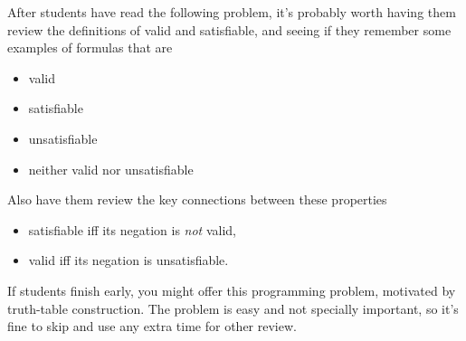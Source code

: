 \documentclass[handout]{mcs}
\begin{document}


\insolutions{\newpage}


\begin{staffnotes}
After students have read the following problem, it's probably worth
having them review the definitions of valid and satisfiable, and seeing
if they remember some examples of formulas that are
\begin{itemize}
\item valid
\item satisfiable
\item unsatisfiable
\item neither valid nor unsatisfiable
\end{itemize}
Also have them review the key connections between these properties
\begin{itemize}
 \item satisfiable iff its negation is \emph{not} valid,
 \item valid iff its negation is unsatisfiable.
\end{itemize}
\end{staffnotes}





\begin{staffnotes}
If students finish early, you might offer this programming problem,
motivated by truth-table construction.  The problem is easy and not
specially important, so it's fine to skip and use any extra time for
other review.
\end{staffnotes}

\iffalse

\begin{center}
\textbf{Supplmental Problem}\footnote{There is no need to study supplmental
  problems when preparing for quizzes or exams.}
\end{center}
\fi
\end{document}
